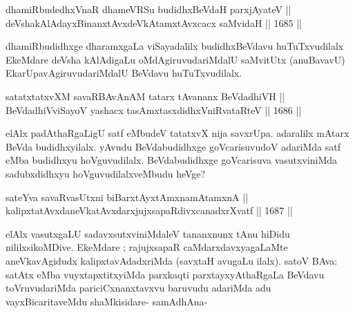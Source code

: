 
\begin{shl}
dhamiRbudedhxVnaR dhameVRSu budidhxBeVdaH parxjAyateV || \\
\footnotemark[2]deVshakAlAdayxBinanxtAvxdeVkAtamxtAvxcacx saMvidaH \hfill || 1685 ||  
\end{shl}

\begin{artha}
dhamiRbudidhxge dharamxgaLa viSayadalilx budidhxBeVdavu huTuTxvudilalx EkeMdare deVsha kAlAdigaLu oMdAgiruvudariMdalU saMvitUtx (anuBavavU) EkarUpavAgiruvudariMdalU BeVdavu huTuTxvudilalx.
\end{artha}


\begin{shl}
satatxtatxvXM savaRBAvAnAM tatarx tAvananx BeVdadhiVH || \\
BeVdadhiVviSayoV yashacx tasAmxtasxdidhxVniRvataRteV \hfill || 1686 ||  
\end{shl}

\begin{artha}
elAlx padAthaRgaLigU satf eMbudeV tatatxvX nija savxrUpa. adaralilx mAtarx BeVda budidhxyilalx. yAvudu BeVdabudidhxge goVcarisuvudoV adariMda satf eMba budidhxyu hoVguvudilalx. BeVdabudidhxge goVcarisuva vasutxviniMda sadubxdidhxyu hoVguvudilalxveMbudu heVge?
\end{artha}

\begin{shl}
sateYva savaRvasUtxni biBarxtAyxtAmxnamAtamxnA || \\
kalipxtatAvxdaneVkatAvxdarxjujxsapaRdivxcanadxrXvatf \hfill || 1687 ||  
\end{shl}

\begin{artha}
elAlx vasutxgaLU sadavxsutxviniMdaleV tananxnunx tAnu hiDidu nililxsikoMDive. EkeMdare ; rajujxsapaR caMdarxdavxyagaLaMte aneVkavAgidudx kalipxtavAdadxriMda (savxtaH avugaLu ilalx). satoV BAva: satAtx eMba vuyxtapxtitxyiMda parxkaqti parxtayxyAthaRgaLa BeVdavu toVruvudariMda pariciCxnanxtavxvu baruvudu adariMda adu vayxBicaritaveMdu shaMkisidare- samAdhAna-
\end{artha}

